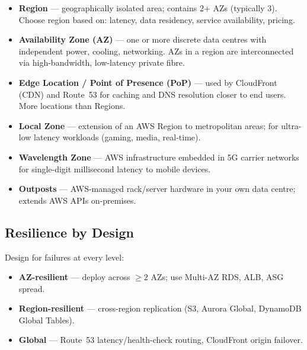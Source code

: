 

\begin{keyfacts}
\begin{itemize}
  \item \textbf{Region} — geographically isolated area; contains 2+ AZs (typically 3).
        Choose region based on: latency, data residency, service availability, pricing.
  \item \textbf{Availability Zone (AZ)} — one or more discrete data centres with independent
        power, cooling, networking. AZs in a region are interconnected via high-bandwidth,
        low-latency private fibre.
  \item \textbf{Edge Location / Point of Presence (PoP)} — used by CloudFront (CDN) and
        Route~53 for caching and DNS resolution closer to end users. More locations than Regions.
  \item \textbf{Local Zone} — extension of an AWS Region to metropolitan areas; for ultra-low
        latency workloads (gaming, media, real-time).
  \item \textbf{Wavelength Zone} — AWS infrastructure embedded in 5G carrier networks for
        single-digit millisecond latency to mobile devices.
  \item \textbf{Outposts} — AWS-managed rack/server hardware in your own data centre; extends
        AWS APIs on-premises.
\end{itemize}
\end{keyfacts}

\subsection{Resilience by Design}

Design for failures at every level:
\begin{itemize}
  \item \textbf{AZ-resilient} — deploy across $\geq 2$ AZs; use Multi-AZ RDS, ALB, ASG spread.
  \item \textbf{Region-resilient} — cross-region replication (S3, Aurora Global, DynamoDB Global Tables).
  \item \textbf{Global} — Route~53 latency/health-check routing, CloudFront origin failover.
\end{itemize}

